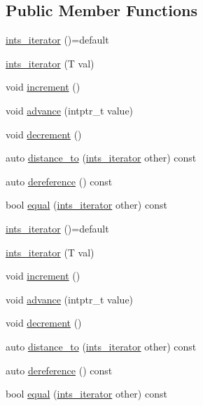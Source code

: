 \subsection*{Public Member Functions}
\begin{DoxyCompactItemize}
\item 
\mbox{\hyperlink{structrah_1_1view_1_1ints__iterator_a2b0f48ff5ad3b3754ea2818bfbefa9d5}{ints\+\_\+iterator}} ()=default
\item 
\mbox{\hyperlink{structrah_1_1view_1_1ints__iterator_aff7958341e1e99c7bf232db2acbb1622}{ints\+\_\+iterator}} (T val)
\item 
void \mbox{\hyperlink{structrah_1_1view_1_1ints__iterator_a34e88e12edf3a728ee91c706749bd1c0}{increment}} ()
\item 
void \mbox{\hyperlink{structrah_1_1view_1_1ints__iterator_a0f8e2c678b31a59deaa522f967c86518}{advance}} (intptr\+\_\+t value)
\item 
void \mbox{\hyperlink{structrah_1_1view_1_1ints__iterator_a08516717bcf1a7e7569863aa05b19392}{decrement}} ()
\item 
auto \mbox{\hyperlink{structrah_1_1view_1_1ints__iterator_affcacb2301246c7c9972c06a86b952ce}{distance\+\_\+to}} (\mbox{\hyperlink{structrah_1_1view_1_1ints__iterator}{ints\+\_\+iterator}} other) const
\item 
auto \mbox{\hyperlink{structrah_1_1view_1_1ints__iterator_ae63cf37f8a217c36a69412ec4de47374}{dereference}} () const
\item 
bool \mbox{\hyperlink{structrah_1_1view_1_1ints__iterator_a5360257e3f004cd3cbbf14f779cace0b}{equal}} (\mbox{\hyperlink{structrah_1_1view_1_1ints__iterator}{ints\+\_\+iterator}} other) const
\item 
\mbox{\hyperlink{structrah_1_1view_1_1ints__iterator_a2b0f48ff5ad3b3754ea2818bfbefa9d5}{ints\+\_\+iterator}} ()=default
\item 
\mbox{\hyperlink{structrah_1_1view_1_1ints__iterator_aff7958341e1e99c7bf232db2acbb1622}{ints\+\_\+iterator}} (T val)
\item 
void \mbox{\hyperlink{structrah_1_1view_1_1ints__iterator_a34e88e12edf3a728ee91c706749bd1c0}{increment}} ()
\item 
void \mbox{\hyperlink{structrah_1_1view_1_1ints__iterator_a0f8e2c678b31a59deaa522f967c86518}{advance}} (intptr\+\_\+t value)
\item 
void \mbox{\hyperlink{structrah_1_1view_1_1ints__iterator_a08516717bcf1a7e7569863aa05b19392}{decrement}} ()
\item 
auto \mbox{\hyperlink{structrah_1_1view_1_1ints__iterator_affcacb2301246c7c9972c06a86b952ce}{distance\+\_\+to}} (\mbox{\hyperlink{structrah_1_1view_1_1ints__iterator}{ints\+\_\+iterator}} other) const
\item 
auto \mbox{\hyperlink{structrah_1_1view_1_1ints__iterator_ae63cf37f8a217c36a69412ec4de47374}{dereference}} () const
\item 
bool \mbox{\hyperlink{structrah_1_1view_1_1ints__iterator_a5360257e3f004cd3cbbf14f779cace0b}{equal}} (\mbox{\hyperlink{structrah_1_1view_1_1ints__iterator}{ints\+\_\+iterator}} other) const
\end{DoxyCompactItemize}
